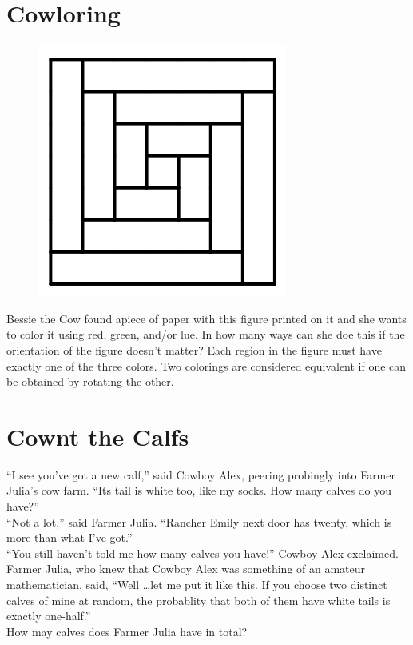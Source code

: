\documentclass{article}
\begin{document}
\section*{Cowloring}
\begin{figure}
    \vspace{-20pt}
    \centering
    \includegraphics[scale=0.35]{cowloring.png}
    \vspace{-20pt}
\end{figure}
Bessie the Cow found apiece of paper with this figure printed on it and she wants to color it using red, green, and/or lue.
In how many ways can she doe this if the orientation of the figure doesn't matter?
Each region in the figure must have exactly one of the three colors.
Two colorings are considered equivalent if one can be obtained by rotating the other.

\section*{Cownt the Calfs}
``I see you've got a new calf,'' said Cowboy Alex, peering probingly into Farmer Julia's cow farm.
``Its tail is white too, like my socks.
How many calves do you have?'' \\[0.25cm]
``Not a lot,'' said Farmer Julia.
``Rancher Emily next door has twenty, which is more than what I've got.'' \\[0.25cm]
``You still haven't told me how many calves you have!'' Cowboy Alex exclaimed. \\[0.25cm]
Farmer Julia, who knew that Cowboy Alex was something of an amateur mathematician, said, ``Well \ldots let me put it like this.
If you choose two distinct calves of mine at random, the probablity that both of them have white tails is exactly one-half.'' \\[0.25cm]
How may calves does Farmer Julia have in total?
\end{document}
